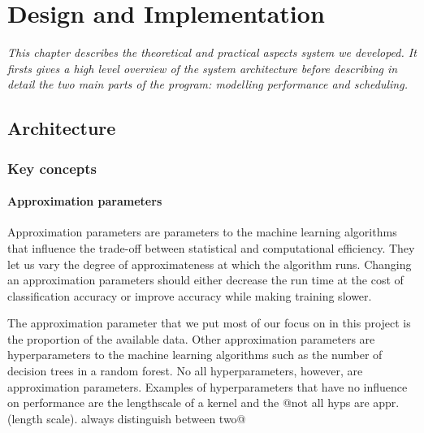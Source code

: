 \documentclass[a4paper,12pt,twoside,openright]{report}
\begin{document}











\chapter{Design and Implementation} 


\textit{This chapter describes the theoretical and practical aspects system we developed. It firsts gives a high level overview of the system architecture before describing in detail the two main parts of the program: modelling performance and scheduling.}

\section{Architecture} %
\subsection{Key concepts}
\subsubsection{Approximation parameters}
Approximation parameters are parameters to the machine learning algorithms that influence the trade-off between statistical and computational efficiency. They let us vary the degree of approximateness at which the algorithm runs. Changing an approximation parameters should either decrease the run time at the cost of classification accuracy or improve accuracy while making training slower. 

The approximation parameter that we put most of our focus on in this project is the proportion of the available data. Other approximation parameters are hyperparameters to the machine learning algorithms such as the number of decision trees in a random forest. No all hyperparameters, however, are approximation parameters. Examples of hyperparameters that have no influence on performance are the lengthscale of a kernel and the 
@not all hyps are appr.(length scale). always distinguish between two@
\end{document}
